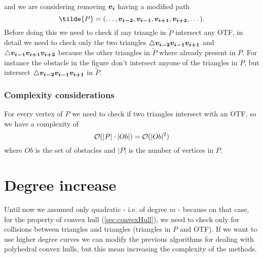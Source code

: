 \documentclass[dissertation.tex]{subfiles}
\begin{document}
and we are
considering removing $\boldsymbol{v_i}$ having a modified path
\begin{equation*}
  \tilde{P}=(\dots,\ve{v_{i-2}},\ve{v_{i-1}},\ve{v_{i+1}},\ve{v_{i+2}},\dots).
\end{equation*}
Before doing this we need to check if any triangle in $\tilde{P}$
intersect any \ac{OTF}, in detail we need to check only the two
triangles $\triangle\boldsymbol{v_{i-2}}\boldsymbol{v_{i-1}}\boldsymbol{v_{i+1}}$ and
$\triangle\boldsymbol{v_{i-1}}\boldsymbol{v_{i+1}}\boldsymbol{v_{i+2}}$ because the other
triangles in $\tilde{P}$ where already present in $P$. For instance
the obstacle in the figure don't intersect anyone of the triangles in
$P$, but intersect $\triangle\boldsymbol{v_{i-2}}\boldsymbol{v_{i-1}}\boldsymbol{v_{i+1}}$ in
$\tilde{P}$.

\subsubsection{Complexity considerations}
For every vertex of $P$ we need to check if two triangles intersect
with an \ac{OTF}, so we have a complexity of
\begin{equation*}
  \mathcal{O}(|P|\cdot|Ob|)=\mathcal{O}(|Ob|^2)
\end{equation*}
where $Ob$ is the set of obstacles and $|P|$ is the number of vertices
in $P$.

\section{Degree increase}\label{sec:degreeInc}
Until now we assumed only quadratic \bss - i.e. of degree $m$ - because
on that case,
for the property of convex hull (\cref{sec:convexHull}),
we need to check only for collisions between triangles and triangles
(triangles in $P$ and \ac{OTF}). If we want to use higher degree
curves we can modify the
previous algorithms for dealing with polyhedral convex hulls, but this
mean increasing the complexity of the methods.
\end{document}
